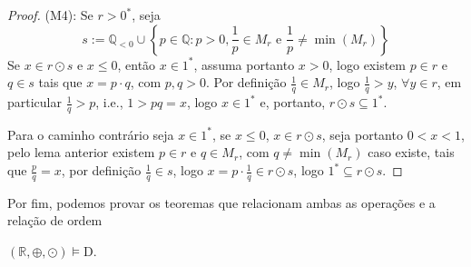 \documentclass[11pt]{article}
\newcommand{\mbb}[1]{\mathbb{#1}}
\begin{document}
\begin{proof}
    (M4): Se $r>0^*$, seja
    $$s:=\mbb{Q}_{<0}\cup\left\{p\in\mbb{Q}:p>0,\frac1p\in M_r\text{ e }\frac1p\neq\min(M_r)\right\}$$
    Se $x\in r\odot s$ e $x\leq0$, então $x\in1^*$, assuma portanto $x>0$, logo existem $p\in r$ e $q\in s$ tais que $x=p\cdot q$, com $p,q>0$. Por definição $\frac1q\in M_r$, logo $\frac1q>y$, $\forall y\in r$, em particular $\frac1q>p$, i.e., $1>pq=x$, logo $x\in1^*$ e, portanto, $r\odot s\subseteq1^*$.

    Para o caminho contrário seja $x\in1^*$, se $x\leq0$, $x\in r\odot s$, seja portanto $0<x<1$, pelo lema anterior existem $p\in r$ e $q\in M_r$, com $q\neq\min(M_r)$ caso existe, tais que $\frac{p}{q}=x$, por definição $\frac1q\in s$, logo $x=p\cdot\frac1q\in r\odot s$, logo $1^*\subseteq r\odot s$.
\end{proof}

Por fim, podemos provar os teoremas que relacionam ambas as operações e a relação de ordem

\begin{shaded}
\begin{theorem}
    $(\mbb{R},\oplus,\odot)\vDash\text{D}$.
\end{theorem}
\end{shaded}
\end{document}
